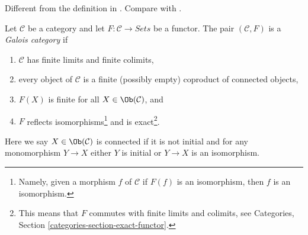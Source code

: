 \begin{definition}
\label{definition-galois-category}
\begin{reference}
Different from the definition in \cite[Expos\'e V, Definition 5.1]{SGA1}.
Compare with \cite[Definition 7.2.1]{BS}.
\end{reference}
Let $\mathcal{C}$ be a category and let $F : \mathcal{C} \to \textit{Sets}$
be a functor. The pair $(\mathcal{C}, F)$ is a {\it Galois category} if
\begin{enumerate}
\item $\mathcal{C}$ has finite limits and finite colimits,
\item
\label{item-connected-components}
every object of $\mathcal{C}$ is a finite (possibly empty)
coproduct of connected objects,
\item $F(X)$ is finite for all $X \in \Ob(\mathcal{C})$, and
\item $F$ reflects isomorphisms\footnote{Namely, given a morphism
$f$ of $\mathcal{C}$ if $F(f)$ is an isomorphism, then
$f$ is an isomorphism.} and is exact\footnote{This means that
$F$ commutes with finite limits and colimits, see
Categories, Section \ref{categories-section-exact-functor}.}.
\end{enumerate}
Here we say $X \in \Ob(\mathcal{C})$ is connected if
it is not initial and for any monomorphism $Y \to X$
either $Y$ is initial or $Y \to X$ is an isomorphism.
\end{definition}